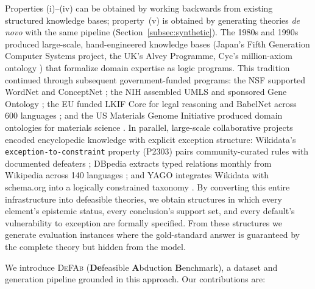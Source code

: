 \documentclass{article}
\theoremstyle{definition}
\begin{document}
Properties (i)--(iv) can be obtained by working backwards from existing structured knowledge bases; property~(v) is obtained by generating theories \emph{de novo} with the same pipeline (Section~\ref{subsec:synthetic}). The 1980s and 1990s produced large-scale, hand-engineered knowledge bases (Japan's Fifth Generation Computer Systems project, the UK's Alvey Programme, Cyc's million-axiom ontology \cite{lenat1990cyc}) that formalize domain expertise as logic programs. This tradition continued through subsequent government-funded programs: the NSF supported WordNet \cite{miller1995wordnet} and ConceptNet \cite{speer2017conceptnet}; the NIH assembled UMLS \cite{lindberg1993umls} and sponsored Gene Ontology \cite{ashburner2000go}; the EU funded LKIF Core for legal reasoning \cite{lkif2007} and BabelNet across 600 languages \cite{navigli2012babelnet}; and the US Materials Genome Initiative produced domain ontologies for materials science \cite{matonto2015}. In parallel, large-scale collaborative projects encoded encyclopedic knowledge with explicit exception structure: Wikidata's \texttt{exception-to-constraint} property (P2303) pairs community-curated rules with documented defeaters \cite{vrandecic2014wikidata}; DBpedia extracts typed relations monthly from Wikipedia across 140 languages \cite{lehmann2015dbpedia}; and YAGO integrates Wikidata with schema.org into a logically constrained taxonomy \cite{suchanek2024yago}. By converting this entire infrastructure into defeasible theories, we obtain structures in which every element's epistemic status, every conclusion's support set, and every default's vulnerability to exception are formally specified. From these structures we generate evaluation instances where the gold-standard answer is guaranteed by the complete theory but hidden from the model.

We introduce \textsc{DeFAb} (\textbf{De}feasible \textbf{A}bduction \textbf{B}enchmark), a dataset and generation pipeline grounded in this approach. Our contributions are:
\end{document}
